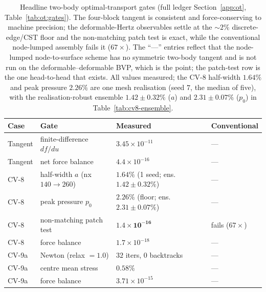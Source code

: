 \documentclass{svjour3}                 %
\begin{document}
\begin{table}[t]
  \centering
  \caption{Headline two-body optimal-transport gates (full ledger Section~\ref{app:ot},
  Table~\ref{tab:ot:gates}). The four-block tangent is consistent and force-conserving to machine precision; the
  deformable-Hertz observables settle at the $\sim2\%$ discrete-edge/CST floor and the non-matching patch test is
  exact, while the conventional node-lumped assembly fails it ($67\times$). The ``---'' entries reflect that the node-lumped
  node-to-surface scheme has no symmetric two-body tangent and is not run on the deformable--deformable BVP, which
  is the point; the patch-test row is the one head-to-head that exists. All values measured; the CV-8 half-width
  $1.64\%$ and peak pressure $2.26\%$ are one mesh realisation (seed $7$, the median of five), with the
  realisation-robust ensemble $1.42\pm0.32\%$ ($a$) and $2.31\pm0.07\%$ ($p_0$) in
  Table~\ref{tab:cv8-ensemble}.}
  \label{tab:twobody:headline}
  \small
  \begin{tabular}{@{}llll@{}}
    \toprule
    Case & Gate & Measured & Conventional \\
    \midrule
    Tangent & finite-difference $df/du$ & $3.45\times10^{-11}$ & --- \\
    Tangent & net force balance & $4.4\times10^{-16}$ & --- \\
    CV-8 & half-width $a$ (nx $140{\to}260$) & $\mathbf{1.64\%}$ (1 seed; ens.\ $1.42{\pm}0.32\%$) & --- \\
    CV-8 & peak pressure $p_0$ & $\mathbf{2.26\%}$ (floor; ens.\ $2.31{\pm}0.07\%$) & --- \\
    CV-8 & non-matching patch test & $\mathbf{1.4\times10^{-16}}$ & fails ($67\times$) \\
    CV-8 & force balance & $1.7\times10^{-18}$ & --- \\
    CV-9a & Newton (relax $=1.0$) & $32$ iters, $0$ backtracks & --- \\
    CV-9a & centre mean stress & $\mathbf{0.58\%}$ & --- \\
    CV-9a & force balance & $3.71\times10^{-15}$ & --- \\
    \bottomrule
  \end{tabular}
\end{table}
\end{document}
